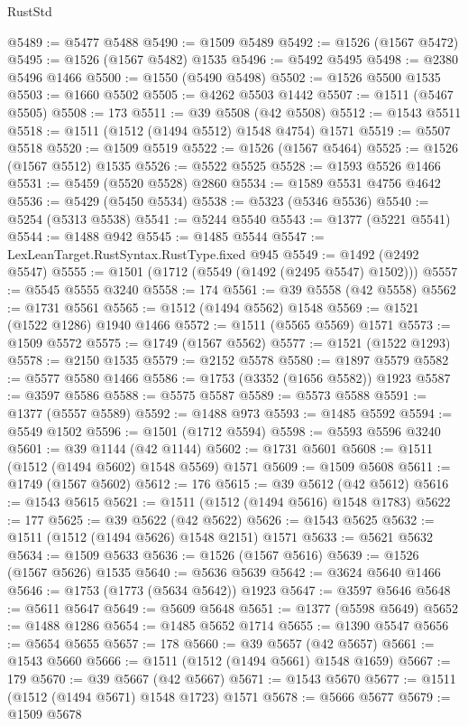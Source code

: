 \begin{lexlean}{RustStd}
\begin{coremodule}
{{@5489 := @5477 @5488
@5490 := @1509 @5489
@5492 := @1526 (@1567 @5472)
@5495 := @1526 (@1567 @5482) @1535
@5496 := @5492 @5495
@5498 := @2380 @5496 @1466
@5500 := @1550 (@5490 @5498)
@5502 := @1526 @5500 @1535
@5503 := @1660 @5502
@5505 := @4262 @5503 @1442
@5507 := @1511 (@5467 @5505)
@5508 := 173
@5511 := @39 @5508 (@42 @5508)
@5512 := @1543 @5511
@5518 := @1511 (@1512 (@1494 @5512) @1548 @4754) @1571
@5519 := @5507 @5518
@5520 := @1509 @5519
@5522 := @1526 (@1567 @5464)
@5525 := @1526 (@1567 @5512) @1535
@5526 := @5522 @5525
@5528 := @1593 @5526 @1466
@5531 := @5459 (@5520 @5528) @2860
@5534 := @1589 @5531 @4756 @4642
@5536 := @5429 (@5450 @5534)
@5538 := @5323 (@5346 @5536)
@5540 := @5254 (@5313 @5538)
@5541 := @5244 @5540
@5543 := @1377 (@5221 @5541)
@5544 := @1488 @942
@5545 := @1485 @5544
@5547 := LexLeanTarget.RustSyntax.RustType.fixed @945
@5549 := @1492 (@2492 @5547)
@5555 := @1501 (@1712 (@5549 (@1492 (@2495 @5547) @1502)))
@5557 := @5545 @5555 @3240
@5558 := 174
@5561 := @39 @5558 (@42 @5558)
@5562 := @1731 @5561
@5565 := @1512 (@1494 @5562) @1548
@5569 := @1521 (@1522 @1286) @1940 @1466
@5572 := @1511 (@5565 @5569) @1571
@5573 := @1509 @5572
@5575 := @1749 (@1567 @5562)
@5577 := @1521 (@1522 @1293)
@5578 := @2150 @1535
@5579 := @2152 @5578
@5580 := @1897 @5579
@5582 := @5577 @5580 @1466
@5586 := @1753 (@3352 (@1656 @5582)) @1923
@5587 := @3597 @5586
@5588 := @5575 @5587
@5589 := @5573 @5588
@5591 := @1377 (@5557 @5589)
@5592 := @1488 @973
@5593 := @1485 @5592
@5594 := @5549 @1502
@5596 := @1501 (@1712 @5594)
@5598 := @5593 @5596 @3240
@5601 := @39 @1144 (@42 @1144)
@5602 := @1731 @5601
@5608 := @1511 (@1512 (@1494 @5602) @1548 @5569) @1571
@5609 := @1509 @5608
@5611 := @1749 (@1567 @5602)
@5612 := 176
@5615 := @39 @5612 (@42 @5612)
@5616 := @1543 @5615
@5621 := @1511 (@1512 (@1494 @5616) @1548 @1783)
@5622 := 177
@5625 := @39 @5622 (@42 @5622)
@5626 := @1543 @5625
@5632 := @1511 (@1512 (@1494 @5626) @1548 @2151) @1571
@5633 := @5621 @5632
@5634 := @1509 @5633
@5636 := @1526 (@1567 @5616)
@5639 := @1526 (@1567 @5626) @1535
@5640 := @5636 @5639
@5642 := @3624 @5640 @1466
@5646 := @1753 (@1773 (@5634 @5642)) @1923
@5647 := @3597 @5646
@5648 := @5611 @5647
@5649 := @5609 @5648
@5651 := @1377 (@5598 @5649)
@5652 := @1488 @1286
@5654 := @1485 @5652 @1714
@5655 := @1390 @5547
@5656 := @5654 @5655
@5657 := 178
@5660 := @39 @5657 (@42 @5657)
@5661 := @1543 @5660
@5666 := @1511 (@1512 (@1494 @5661) @1548 @1659)
@5667 := 179
@5670 := @39 @5667 (@42 @5667)
@5671 := @1543 @5670
@5677 := @1511 (@1512 (@1494 @5671) @1548 @1723) @1571
@5678 := @5666 @5677
@5679 := @1509 @5678
}}
\end{coremodule}
\end{lexlean}
